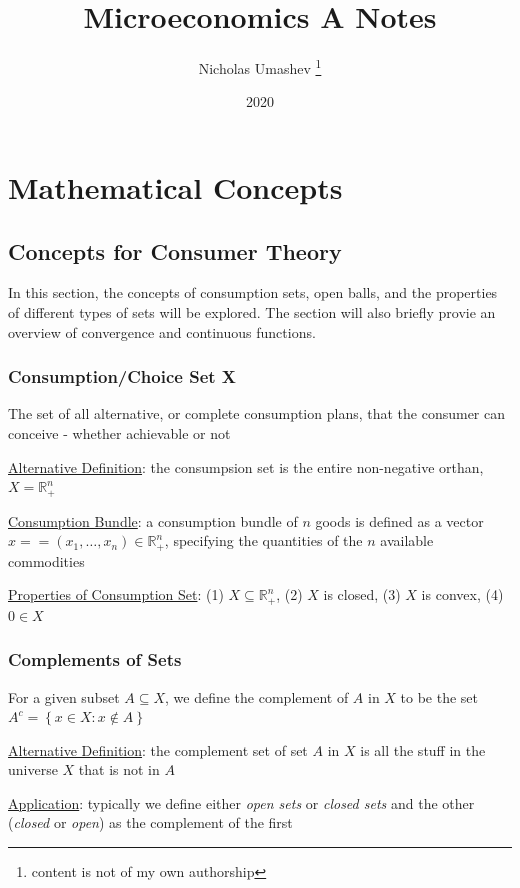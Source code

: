 \documentclass{article}
\title{Microeconomics A Notes}
\author{Nicholas Umashev \footnote{content is not of my own authorship}}
\date{2020}
\begin{document}
\maketitle

\tableofcontents

\newpage

\section{Mathematical Concepts}

\vspace{2.5mm}
\subsection{Concepts for Consumer Theory}
In this section, the concepts of consumption sets, open balls, and the properties of different types of sets will be explored. The section will also briefly provie an overview of convergence and continuous functions. \par
\vspace{6mm}
\subsubsection{Consumption/Choice Set X}
The set of all alternative, or complete consumption plans, that the consumer can conceive - whether achievable or not \par \vspace{0.3em}
  \underline{Alternative Definition}: the consumpsion set is the entire non-negative orthan, $X = \mathbb{R}^{n}_{+}$ \par
  \underline{Consumption Bundle}: a consumption bundle of $n$ goods is defined as a vector $x == (x_{1}, \dots, x_{n}) \in \mathbb{R}_{+}^{n}$, specifying the quantities of the $n$ available commodities \par
  \underline{Properties of Consumption Set}: (1) $X \subseteq \mathbb{R}_{+}^{n}$, (2) $X$ is closed, (3) $X$ is convex, (4) $0 \in X$ \par
\vspace{6mm}
\subsubsection{Complements of Sets}
For a given subset $A \subseteq X$, we define the complement of $A$ in $X$ to be the set $A^{c} = \left\{ x \in X: x \notin A \right\}$ \par \vspace{0.3em}
  \underline{Alternative Definition}: the complement set of set $A$ in $X$ is all the stuff in the universe $X$ that is not in $A$ \par
  \underline{Application}: typically we define either \textit{open sets} or \textit{closed sets} and the other (\textit{closed} or \textit{open}) as the complement of the first \par
\vspace{6mm}
\end{document}
